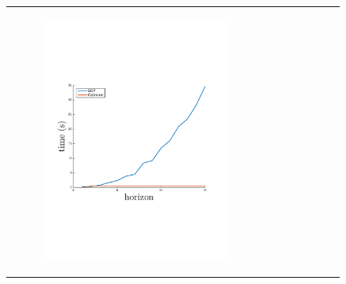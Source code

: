 \documentclass[letterpaper]{article}
\begin{document}
\label{sec:time_space}

{\centering
\begin{figure}[]
    \begin{tabular}{cc}
        \begin{subfigure}{0.45\columnwidth}
            \centering 
            \includegraphics[width=\columnwidth,height=0.12\textheight]{time_plot_new}
            \label{fig:time_complexity}
        \end{subfigure} &
        \begin{subfigure}{0.45\columnwidth}
            \centering 

\end{subfigure}
\end{tabular}
\end{figure}}
\end{document}
